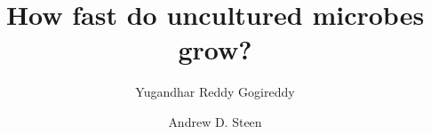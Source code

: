 \documentclass[webpdf,contemporary,large,namedate]{oup-authoring-template}
\newcommand{\plan}[1]{\textcolor{red}{[#1]}}
\begin{document}

\title[How fast do uncultured microbes grow?]{How fast do uncultured microbes grow?}

\author[1]{Yugandhar Reddy Gogireddy}
\author[1,$\ast$]{Andrew D. Steen}

\address[1]{, }





{\let\sfdefault\rmdefault\maketitle}
\makeatletter
\def\ps@headings{%
  \let\@oddfoot\@empty\let\@evenfoot\@empty
  \def\@evenhead{\hbox to \textwidth{\sffamily\fontseries{m}\fontsize{9bp}{10bp}\selectfont\thepage\hfill}}%
  \def\@oddhead{\hbox to \textwidth{\hfill\sffamily\fontseries{m}\fontsize{9bp}{10bp}\selectfont\thepage}}%
  \def\titlemark##1{\markboth{##1}{##1}}}
\def\ps@opening{\let\@oddhead\@empty\let\@evenhead\@empty\let\@oddfoot\@empty\let\@evenfoot\@empty}
\makeatother
\pagestyle{headings}








\end{document}
